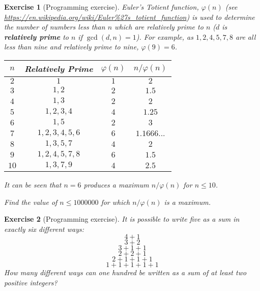 \documentclass[11pt]{amsart}
\theoremstyle{theorem}
\newtheorem{exercise}{Exercise}
\begin{document}
\begin{exercise}[Programming exercise]
Euler's Totient function, $\varphi(n)$ (see \url{https://en.wikipedia.org/wiki/Euler\%27s_totient_function}) is used to determine the number of numbers less than $n$ which are relatively prime to $n$ ($d$ is \textbf{relatively prime} to $n$ if $\gcd(d,n)=1$). For example, as $1,2,4,5,7,8$ are all less than nine and relatively prime to nine, $\varphi(9)=6$.
\begin{center}
\begin{tabular}{|c|c|c|c|}
\hline
$n$ & Relatively Prime & $\varphi(n)$ &$n/\varphi(n)$ \\
\hline
$2$ & $1$ & $1$ & $2$ \\
\hline 
$3$ & $1,2$ & $2$ & $1.5$ \\
\hline
$4$ & $1,3$ & $2$ & $2$ \\
\hline
$5$ & $1,2,3,4$ & $4$ & $1.25$ \\
\hline
$6$ & $1,5$ & $2$ & $3$ \\
\hline
$7$ & $1,2,3,4,5,6$ & $6$ & $1.1666...$ \\
\hline
$8$ & $1,3,5,7$ & $4$ & $2$ \\
\hline
$9$ & $1,2,4,5,7,8$ & $6$ & $1.5$ \\
\hline
$10$ & $1,3,7,9$ & $4$ & $2.5$ \\
\hline
\end{tabular}
\end{center}
It can be seen that $n=6$ produces a maximum $n/\varphi(n)$ for $n\leq 10$.

Find the value of $n\leq 1000000$ for which $n/\varphi(n)$ is a maximum.
\end{exercise}


\begin{exercise}[Programming exercise]
It is possible to write five as a sum in exactly six different ways:
\[
4+1
\]
\[
3+2
\]
\[
3+1+1
\]
\[
2+2+1
\]
\[
2+1+1+1
\]
\[
1+1+1+1+1
\]
How many different ways can one hundred be written as a sum of at least two positive integers?
\end{exercise}
\end{document}
